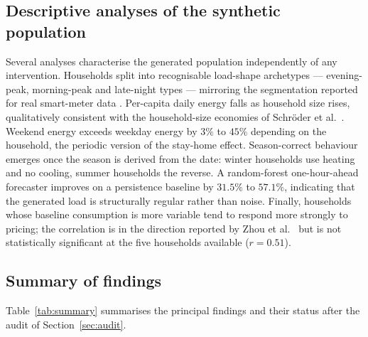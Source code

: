 \documentclass[11pt]{article}
\begin{document}
\subsection{Descriptive analyses of the synthetic population}
Several analyses characterise the generated population independently of any intervention. Households split
into recognisable load-shape archetypes --- evening-peak, morning-peak and late-night types --- mirroring
the segmentation reported for real smart-meter data \cite{jin2021}. Per-capita daily energy falls as
household size rises, qualitatively consistent with the household-size economies of Schr\"oder et al.\
\cite{schroder2013}. Weekend energy exceeds weekday energy by $3\%$ to $45\%$ depending on the household,
the periodic version of the stay-home effect. Season-correct behaviour emerges once the season is derived
from the date: winter households use heating and no cooling, summer households the reverse. A
random-forest one-hour-ahead forecaster improves on a persistence baseline by $31.5\%$ to $57.1\%$,
indicating that the generated load is structurally regular rather than noise. Finally, households whose
baseline consumption is more variable tend to respond more strongly to pricing; the correlation is in the
direction reported by Zhou et al.\ \cite{zhou2016} but is not statistically significant at the five
households available ($r=0.51$).

\subsection{Summary of findings}
Table~\ref{tab:summary} summarises the principal findings and their status after the audit of
Section~\ref{sec:audit}.
\end{document}
